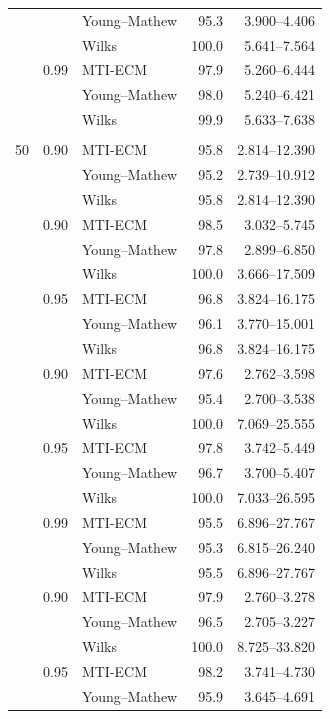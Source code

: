 \begin{longtable}{@{}rrlrr@{}}
 &  & Young--Mathew & 95.3 & 3.900--4.406 \\
 &  & Wilks & 100.0 & 5.641--7.564 \\
\addlinespace[0.25em]
1000 & 0.99 & MTI-ECM & 97.9 & 5.260--6.444 \\
 &  & Young--Mathew & 98.0 & 5.240--6.421 \\
 &  & Wilks & 99.9 & 5.633--7.638 \\
\addlinespace[0.25em]
\multicolumn{5}{@{}l}{\textit{Student t(3)}}\\
50 & 0.90 & MTI-ECM & 95.8 & 2.814--12.390 \\
 &  & Young--Mathew & 95.2 & 2.739--10.912 \\
 &  & Wilks & 95.8 & 2.814--12.390 \\
\addlinespace[0.25em]
100 & 0.90 & MTI-ECM & 98.5 & 3.032--5.745 \\
 &  & Young--Mathew & 97.8 & 2.899--6.850 \\
 &  & Wilks & 100.0 & 3.666--17.509 \\
\addlinespace[0.25em]
100 & 0.95 & MTI-ECM & 96.8 & 3.824--16.175 \\
 &  & Young--Mathew & 96.1 & 3.770--15.001 \\
 &  & Wilks & 96.8 & 3.824--16.175 \\
\addlinespace[0.25em]
500 & 0.90 & MTI-ECM & 97.6 & 2.762--3.598 \\
 &  & Young--Mathew & 95.4 & 2.700--3.538 \\
 &  & Wilks & 100.0 & 7.069--25.555 \\
\addlinespace[0.25em]
500 & 0.95 & MTI-ECM & 97.8 & 3.742--5.449 \\
 &  & Young--Mathew & 96.7 & 3.700--5.407 \\
 &  & Wilks & 100.0 & 7.033--26.595 \\
\addlinespace[0.25em]
500 & 0.99 & MTI-ECM & 95.5 & 6.896--27.767 \\
 &  & Young--Mathew & 95.3 & 6.815--26.240 \\
 &  & Wilks & 95.5 & 6.896--27.767 \\
\addlinespace[0.25em]
1000 & 0.90 & MTI-ECM & 97.9 & 2.760--3.278 \\
 &  & Young--Mathew & 96.5 & 2.705--3.227 \\
 &  & Wilks & 100.0 & 8.725--33.820 \\
\addlinespace[0.25em]
1000 & 0.95 & MTI-ECM & 98.2 & 3.741--4.730 \\
 &  & Young--Mathew & 95.9 & 3.645--4.691 \\

\end{longtable}
